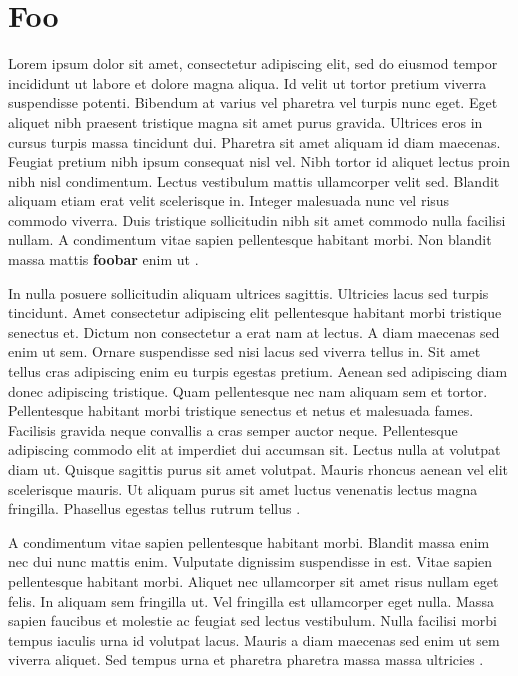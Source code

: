 \documentclass{article}
\begin{document}
\section{Foo}
\label{foo}
Lorem ipsum dolor sit amet, consectetur adipiscing elit, sed do eiusmod tempor
incididunt ut labore et dolore magna aliqua. Id velit ut tortor pretium viverra
suspendisse potenti. Bibendum at varius vel pharetra vel turpis nunc eget. Eget
aliquet nibh praesent tristique magna sit amet purus gravida. Ultrices eros in
cursus turpis massa tincidunt dui. Pharetra sit amet aliquam id diam maecenas.
Feugiat pretium nibh ipsum consequat nisl vel. Nibh tortor id aliquet lectus
proin nibh nisl condimentum. Lectus vestibulum mattis ullamcorper velit sed.
Blandit aliquam etiam erat velit scelerisque in. Integer malesuada nunc vel
risus commodo viverra. Duis tristique sollicitudin nibh sit amet commodo nulla
facilisi nullam. A condimentum vitae sapien pellentesque habitant morbi. Non
\cite{mahajan2010efficient} blandit massa mattis \textbf{foobar}
\cite{mahajan2010efficient} enim ut \cite{mahajan2010efficient} .
\par
In nulla posuere sollicitudin aliquam ultrices sagittis. Ultricies lacus sed
turpis tincidunt. Amet consectetur adipiscing elit pellentesque habitant morbi
tristique senectus et. Dictum non consectetur a erat nam at lectus. A diam
maecenas sed enim ut sem. Ornare suspendisse sed nisi lacus sed viverra tellus
in. Sit amet tellus cras adipiscing enim eu turpis egestas pretium. Aenean sed
adipiscing diam donec adipiscing tristique. Quam pellentesque nec nam aliquam
sem et tortor. Pellentesque habitant morbi tristique senectus et netus et
malesuada fames. Facilisis gravida neque convallis a cras semper auctor neque.
Pellentesque adipiscing commodo elit at imperdiet dui accumsan sit. Lectus
nulla at volutpat diam ut. Quisque sagittis purus sit amet volutpat. Mauris
rhoncus aenean vel elit scelerisque mauris. Ut aliquam purus sit amet luctus
venenatis lectus magna fringilla. Phasellus egestas tellus rutrum tellus
\cite{zhou_da_fir_fpga}.
\par
A condimentum vitae sapien pellentesque habitant morbi. Blandit massa enim nec
dui nunc mattis enim. Vulputate dignissim suspendisse in est. Vitae sapien
pellentesque habitant morbi. Aliquet nec ullamcorper sit amet risus nullam eget
felis. In aliquam sem fringilla ut. Vel fringilla est ullamcorper eget nulla.
Massa sapien faucibus et molestie ac feugiat sed lectus vestibulum. Nulla
facilisi morbi tempus iaculis urna id volutpat lacus. Mauris a diam maecenas
sed enim ut sem viverra aliquet. Sed tempus urna et pharetra pharetra massa
massa ultricies \cite{avi_dist_dwt_fpga_2015}.
\end{document}
